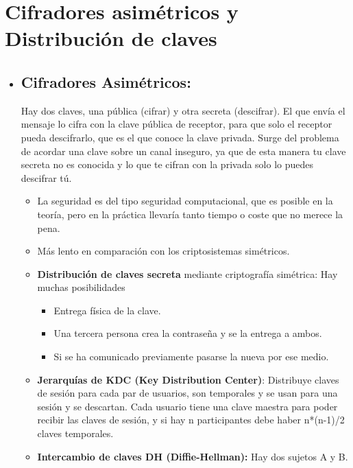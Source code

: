 \documentclass[12pt, twoside, openright]{report} %
\begin{document}
\section{Cifradores asimétricos y Distribución de claves}
\begin{itemize}
	\item \subsection{Cifradores Asimétricos:} Hay dos claves, una pública
	      (cifrar) y otra secreta (descifrar). El que envía el mensaje lo cifra con la clave pública de receptor, para que solo el receptor pueda descifrarlo, que es el que conoce la clave privada. Surge del problema de acordar una clave sobre un canal inseguro, ya que de esta manera tu clave secreta no es conocida y lo que te cifran con la privada solo lo puedes descifrar tú.
	      \begin{itemize}
		      \item La seguridad es del tipo seguridad computacional, que es posible en la teoría, pero en la práctica llevaría tanto tiempo o coste que no merece la pena.
		      \item Más lento en comparación con los criptosistemas simétricos.
	      \end{itemize}
	      \begin{itemize}
		      \item \textbf{Distribución de claves secreta} mediante criptografía simétrica: Hay muchas posibilidades
		            \begin{itemize}
			            \item Entrega física de la clave.
			            \item Una tercera persona crea la contraseña y se la entrega a ambos.
			            \item Si se ha comunicado previamente pasarse la nueva por ese medio.
		            \end{itemize}
		      \item \textbf{Jerarquías de KDC (Key Distribution Center)}: Distribuye claves de sesión para cada par de usuarios, son temporales y se usan para una sesión y se descartan. Cada usuario tiene una clave maestra para poder recibir las claves de sesión, y si hay n participantes debe haber n*(n-1)/2 claves temporales.
		      \item \textbf{Intercambio de claves DH (Diffie-Hellman):} Hay dos sujetos A y B.
		            \begin{itemize}

\end{itemize}
\end{itemize}
\end{itemize}
\end{document}
